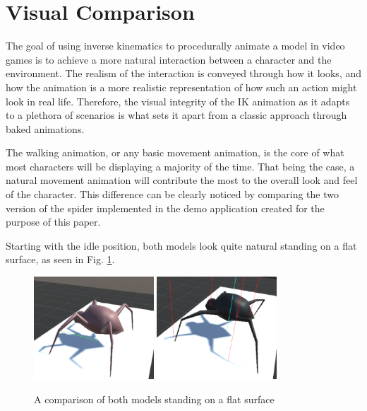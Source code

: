 \section{Visual Comparison}
The goal of using inverse kinematics to procedurally animate a model in video
games is to achieve a more natural interaction between a character and the
environment. The realism of the interaction is conveyed through how it looks,
and how the animation is a more realistic representation of how such an action
might look in real life. Therefore, the visual integrity of the IK animation as
it adapts to a plethora of scenarios is what sets it apart from a classic
approach through baked animations. 

The walking animation, or any basic movement animation, is the core of what
most characters will be displaying a majority of the time. That being the case,
a natural movement animation will contribute the most to the overall look and
feel of the character. This difference can be clearly noticed by comparing the
two version of the spider implemented in the demo application created for the
purpose of this paper. 

Starting with the idle position, both models look quite natural standing on
a flat surface, as seen in Fig. \ref{fig:sp_flat}.


\begin{figure}[h!]
    \centering
    \captionsetup{justification=centering}
    \includegraphics[width=0.4\textwidth]{grafika/sp_b_flat.eps}
    \includegraphics[width=0.4\textwidth]{grafika/sp_ik_flat.eps}
    \caption{A comparison of both models standing on a flat surface}
    \label{fig:sp_flat}
\end{figure}

